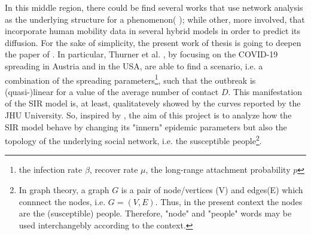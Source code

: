 \documentclass[a4paper,11pt,twoside]{book} %
\begin{document}
In this middle region, there could be find several works that use network analysis as the underlying structure for a phenomenon(\cite{Thurner::NetBasedExpl} \cite{VespignaniSatorras2001Epidemic} \cite{pizzuti::2020_ItalyCOVIDnetwork}); while other, more involved, that incorporate human mobility data in several hybrid models \cite{ZEROUAL::DL_COVID19, Stubinger::Incidence_Diff_Countries} in order to predict its diffusion. For the sake of simplicity, the present work of thesis is going to deepen the paper of \cite{Thurner::NetBasedExpl}. In particular, Thurner et al. \cite{Thurner::NetBasedExpl}, by focusing on the COVID-19 spreading in Austria and in the USA, are able to find a scenario, i.e. a combination of the spreading parameters\footnote{the infection rate $\beta$, recover rate $\mu$, the long-range attachment probability $p$}, such that the outbreak is (quasi-)linear for a value of the average number of contact $D$. This manifestation of the SIR model is, at least, qualitatevely showed by the curves reported by the JHU University. 
So, inspired by \cite{Thurner::NetBasedExpl}, the aim of this project is to analyze how the SIR model behave by changing its "innern" epidemic parameters but also the topology of the underlying social network, i.e. the susceptible people\footnote{In graph theory, a graph $G$ is a pair of node/vertices (V) and edges(E) which connnect the nodes, i.e. $G = (V,E)$. Thus, in the present context the nodes are the (susceptible) people. Therefore, "node" and "people" words may be used interchangebly according to the context.}.
\end{document}
